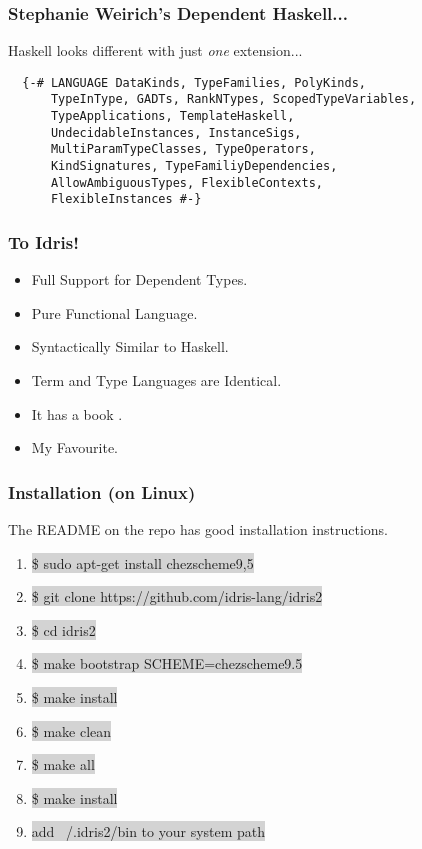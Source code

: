 \documentclass[hyperref={colorlinks = true,linkcolor = blue, citecolor = blue, urlcolor = blue}]{beamer}
\begin{document}
\begin{frame}[fragile]
  \frametitle{Stephanie Weirich's Dependent Haskell...}
  Haskell looks different with just \emph{one} extension...
  \begin{verbatim}
  {-# LANGUAGE DataKinds, TypeFamilies, PolyKinds, 
      TypeInType, GADTs, RankNTypes, ScopedTypeVariables,
      TypeApplications, TemplateHaskell, 
      UndecidableInstances, InstanceSigs, 
      MultiParamTypeClasses, TypeOperators, 
      KindSignatures, TypeFamiliyDependencies, 
      AllowAmbiguousTypes, FlexibleContexts, 
      FlexibleInstances #-}
  \end{verbatim}
\end{frame}

\begin{frame}[fragile]
  \frametitle{To Idris!}
  \begin{itemize}
    \item Full Support for Dependent Types.
    \item Pure Functional Language.
    \item Syntactically Similar to Haskell.
    \item Term and Type Languages are Identical.
    \item It has a book \citep{brady2017type}.
    \item My Favourite.
  \end{itemize}
\end{frame}

\begin{frame}[fragile]
  \frametitle{Installation (on Linux)}
  The README on the repo has good installation instructions.
  \begin{enumerate}
    \item \colorbox{lightgray}{\$ sudo apt-get install chezscheme9,5}
    \item \colorbox{lightgray}{\$ git clone https://github.com/idris-lang/idris2}
    \item \colorbox{lightgray}{\$ cd idris2}
    \item \colorbox{lightgray}{\$ make bootstrap SCHEME=chezscheme9.5}
    \item \colorbox{lightgray}{\$ make install}
    \item \colorbox{lightgray}{\$ make clean}
    \item \colorbox{lightgray}{\$ make all}
    \item \colorbox{lightgray}{\$ make install}
    \item \colorbox{lightgray}{add ~/.idris2/bin to your system path}
  \end{enumerate}
\end{frame}
\end{document}
